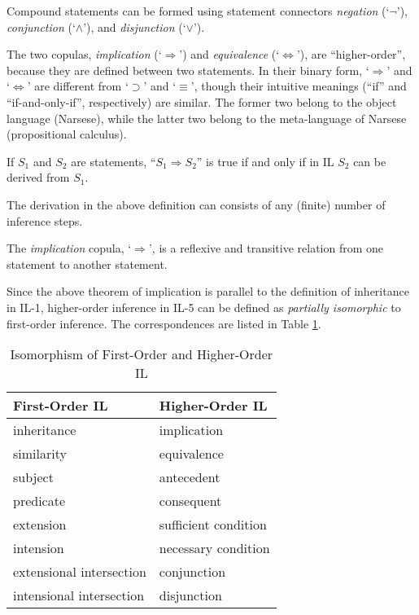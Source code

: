 Compound statements can be formed using statement connectors \emph{negation} (`$\neg$'), \emph{conjunction} (`$\wedge$'), and \emph{disjunction} (`$\vee$').

The two copulas, \emph{implication} (`$\Rightarrow$') and \emph{equivalence} (`$\Leftrightarrow$'), are ``higher-order'', because they are defined between two statements.  In their binary form, `$\Rightarrow$' and `$\Leftrightarrow$' are different from `$\supset$' and `$\equiv$', though their intuitive meanings (``if'' and ``if-and-only-if'', respectively) are similar. The former two belong to the object language (Narsese), while the latter two belong to the meta-language of Narsese (propositional calculus).

\begin{defi}
If $S_1$ and $S_2$ are statements, ``\(S_1 \Rightarrow S_2\)'' is true if and only if in IL \(S_2\) can be derived from \(S_1\).
\end{defi} 
The derivation in the above definition can consists of any (finite) number of inference steps.

\begin{theo}
The \emph{implication} copula, `$\Rightarrow$', is a reflexive and transitive relation from one statement to another statement.    
\end{theo}

Since the above theorem of implication is parallel to the definition of inheritance in IL-1, higher-order inference in IL-5 can be defined as \emph{partially isomorphic} to first-order inference.  The correspondences are listed in Table \ref{Isomorphism}.

\begin{table}[htb]
\centering
\begin{tabular}{|l|l|} \hline
\textbf{First-Order IL} 			& \textbf{Higher-Order IL} \\
\hline
inheritance													& implication \\
similarity													& equivalence \\
subject									  					& antecedent	\\	
predicate														& consequent	\\	
extension														& sufficient condition	\\	
intension														& necessary condition \\
extensional intersection						& conjunction \\ 
intensional intersection						& disjunction \\
\hline \end{tabular} \\
\caption{Isomorphism of First-Order and Higher-Order IL}
\label{Isomorphism}
\end{table}

